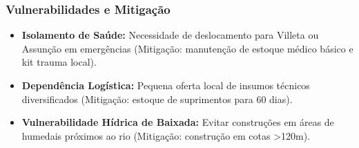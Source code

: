 \subsubsection{Vulnerabilidades e
Mitigação}

\begin{itemize}
\tightlist
\item
  \textbf{Isolamento de Saúde:} Necessidade de deslocamento para Villeta
  ou Assunção em emergências (Mitigação: manutenção de estoque médico
  básico e kit trauma local).
\item
  \textbf{Dependência Logística:} Pequena oferta local de insumos
  técnicos diversificados (Mitigação: estoque de suprimentos para 60
  dias).
\item
  \textbf{Vulnerabilidade Hídrica de Baixada:} Evitar construções em
  áreas de humedais próximos ao rio (Mitigação: construção em cotas
  \textgreater120m).
\end{itemize}


